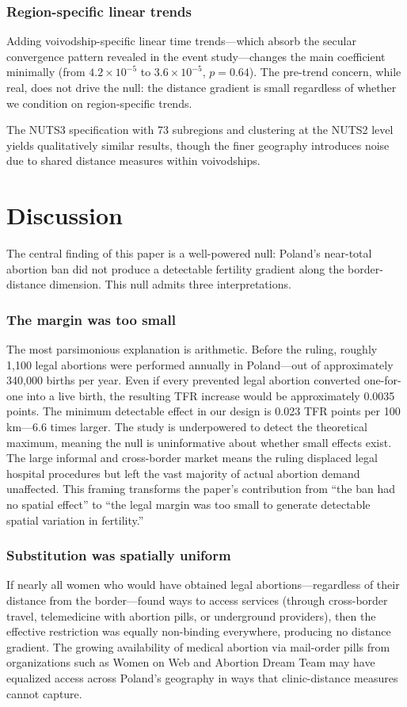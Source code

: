 \documentclass[12pt]{article}
\begin{document}
\subsubsection*{Region-specific linear trends} Adding voivodship-specific linear time trends---which absorb the secular convergence pattern revealed in the event study---changes the main coefficient minimally (from $4.2 \times 10^{-5}$ to $3.6 \times 10^{-5}$, $p = 0.64$). The pre-trend concern, while real, does not drive the null: the distance gradient is small regardless of whether we condition on region-specific trends.

The NUTS3 specification with 73 subregions and clustering at the NUTS2 level yields qualitatively similar results, though the finer geography introduces noise due to shared distance measures within voivodships.


\section{Discussion}
\label{sec:discussion}

The central finding of this paper is a well-powered null: Poland's near-total abortion ban did not produce a detectable fertility gradient along the border-distance dimension. This null admits three interpretations.

\subsubsection*{The margin was too small} The most parsimonious explanation is arithmetic. Before the ruling, roughly 1,100 legal abortions were performed annually in Poland---out of approximately 340,000 births per year. Even if every prevented legal abortion converted one-for-one into a live birth, the resulting TFR increase would be approximately 0.0035 points. The minimum detectable effect in our design is 0.023 TFR points per 100 km---6.6 times larger. The study is underpowered to detect the theoretical maximum, meaning the null is uninformative about whether small effects exist. The large informal and cross-border market \citep{bearak2020} means the ruling displaced legal hospital procedures but left the vast majority of actual abortion demand unaffected. This framing transforms the paper's contribution from ``the ban had no spatial effect'' to ``the legal margin was too small to generate detectable spatial variation in fertility.''

\subsubsection*{Substitution was spatially uniform} If nearly all women who would have obtained legal abortions---regardless of their distance from the border---found ways to access services (through cross-border travel, telemedicine with abortion pills, or underground providers), then the effective restriction was equally non-binding everywhere, producing no distance gradient. The growing availability of medical abortion via mail-order pills from organizations such as Women on Web and Abortion Dream Team may have equalized access across Poland's geography in ways that clinic-distance measures cannot capture.
\end{document}
